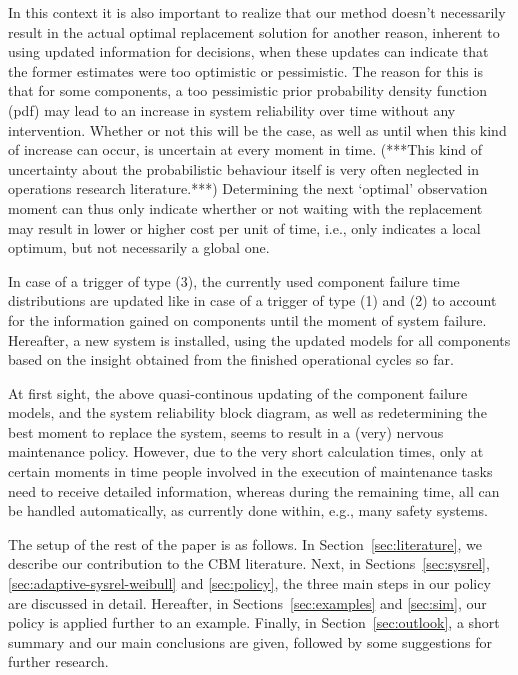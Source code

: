 \documentclass[authoryear]{elsarticle}
\begin{document}
In this context it is also important to realize that our method
doesn't necessarily result in the actual optimal replacement solution for another reason,
inherent to using updated information for decisions,
when these updates can indicate that the former estimates were too optimistic or pessimistic.
The reason for this is that for some components,
a too pessimistic prior probability density function (pdf)
may lead to an increase in system reliability over time without any intervention.
Whether or not this will be the case, as well as until when this kind of increase can occur,
is uncertain at every moment in time.
(***This kind of uncertainty about the probabilistic behaviour itself is very often neglected in operations research literature.***)
Determining the next `optimal' observation moment can thus only indicate wherther or not waiting with the replacement
may result in lower or higher cost per unit of time,
i.e., only indicates a local optimum,
but not necessarily a global one.

In case of a trigger of type (3),
the currently used component failure time distributions are updated
like in case of a trigger of type (1) and (2)
to account for the information gained on components
until the moment of system failure.
Hereafter, a new system is installed,
using the updated models for all components based on the insight obtained from the finished operational cycles so far.

At first sight, the above quasi-continous updating of the component failure models,
and the system reliability block diagram,
as well as redetermining the best moment to replace the system,
seems to result in a (very) nervous maintenance policy.
However, due to the very short calculation times,
only at certain moments in time people involved in the execution of maintenance tasks
need to receive detailed information,
whereas during the remaining time,
all can be handled automatically, as currently done within, e.g., many safety systems. 

The setup of the rest of the paper is as follows.
In Section~\ref{sec:literature}, we describe our contribution to the CBM literature.
Next, in Sections~\ref{sec:sysrel}, \ref{sec:adaptive-sysrel-weibull} and \ref{sec:policy},
the three main steps in our policy are discussed in detail.
Hereafter, in Sections~\ref{sec:examples} and \ref{sec:sim},
our policy is applied further to an example.
Finally, in Section~\ref{sec:outlook},
a short summary and our main conclusions are given,
followed by some suggestions for further research.
\end{document}
